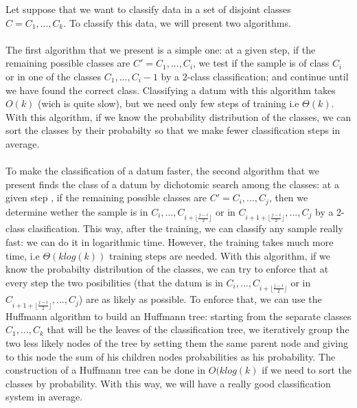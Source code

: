 Let suppose that we want to classify data in a set of disjoint classes $C={C_1,...,C_k}$. To classify this data, we will present two algorithms.

\paragraph{}
The first algorithm that we present is a simple one: at a given step, if the remaining possible classes are $C'={C_1,...,C_i}$, we test if the sample is of class $C_i$ or in one of the classes $C_1,...,C_i-1$ by a 2-class classification; and continue until we have found the correct class.
\newline
Classifying a datum with this algorithm takes $O(k)$ (wich is quite slow), but we need only few steps of training i.e $\Theta(k)$.
\newline
With this algorithm, if we know the probability distribution of the classes, we can sort the classes by their probabilty so that we make fewer classification steps in average.

\paragraph{}
To make the classification of a datum faster, the second algorithm that we present finds the class of a datum by dichotomic search among the classes: at a given step , if the remaining possible classes are $C'={C_i,...,C_j}$, then we determine wether the sample is in ${C_i,...,C_{i+\lfloor \frac{j-i}{2} \rfloor}}$ or in ${C_{i+1+\lfloor \frac{j-i}{2} \rfloor},...,C_j}$ by a 2-class clasification.
\newline
This way, after the training, we can classify any sample really fast: we can do it in logarithmic time. However, the training takes much more time, i.e $\Theta(klog(k))$ training steps are needed.
\newline
With this algorithm, if we know the probabilty distribution of the classes, we can try to enforce that at every step the two posibilities (that the datum is in ${C_i,...,C_{i+\lfloor \frac{j-i}{2} \rfloor}}$ or in ${C_{i+1+\lfloor \frac{j-i}{2} \rfloor},...,C_j}$) are as likely as possible.
\newline
To enforce that, we can use the Huffmann algorithm to build an Huffmann tree: starting from the separate classes $C_1,...,C_k$ that will be the leaves of the classification tree, we iteratively group the two less likely nodes of the tree by setting them the same parent node and giving to this node the sum of his children nodes probabilities as his probability.
The construction of a Huffmann tree can be done in $O(klog(k)$ if we need to sort the classes by probability.
\newline
With this way, we will have a really good classification system in average.

